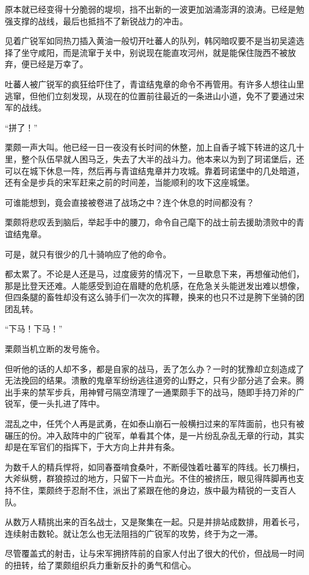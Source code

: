 原本就已经变得十分脆弱的堤坝，挡不出新的一波更加汹涌澎湃的浪涛。已经是勉强支撑的战线，最后也抵挡不了新锐战力的冲击。

见着广锐军如同热刀插入黄油一般切开吐蕃人的队列，韩冈暗叹要不是当初吴逵选择了坐守咸阳，而是流窜于关中，别说现在能直攻河州，就是能保住陇西不被放弃，便已经是万幸了。

吐蕃人被广锐军的疯狂给吓住了，青谊结鬼章的命令不再管用。有许多人想往山里逃窜，但他们立刻发现，从现在的位置前往最近的一条进山小道，免不了要通过宋军的战线。

“拼了！”

栗颇一声大叫。他已经一日一夜没有长时间的休整，加上自香子城下转进的这几十里，整个队伍早就人困马乏，失去了大半的战斗力。他本来以为到了珂诺堡后，还可以在城下休息一阵，然后再与青谊结鬼章并力攻城。靠着珂诺堡中的几处暗道，还有全是步兵的宋军赶来之前的时间差，当能顺利的攻下这座城堡。

可谁能想到，竟会直接被卷进了战场之中？连个休息的时间都没有？

栗颇将悲叹丢到脑后，举起手中的腰刀，命令自己麾下的战士前去援助溃败中的青谊结鬼章。

可是，就只有很少的几十骑响应了他的命令。

都太累了。不论是人还是马，过度疲劳的情况下，一旦歇息下来，再想催动他们，那是比登天还难。人能感受到迫在眉睫的危机感，在危急关头能迸发出难以想像，但四条腿的畜牲却没有这么骑手们一次次的挥鞭，换来的也只不过是胯下坐骑的团团乱转。

“下马！下马！”

栗颇当机立断的发号施令。

但听他的话的人却不多，都是自家的战马，丢了怎么办？一时的犹豫却立刻造成了无法挽回的结果。溃散的鬼章军纷纷逃往道旁的山野之，只有少部分逃了会来。腾出手来的禁军步兵，用神臂弓隔空清理了一通栗颇手下的战马，随即手持刀斧的广锐军，便一头扎进了阵中。

混乱之中，任凭个人再是武勇，在如泰山崩石一般横扫过来的军阵面前，也只有被碾压的份。冲入敌阵中的广锐军，单看其个体，是一片纷乱杂乱无章的行动，其实却是在军官们的指挥下，于大方向上井井有条。

为数千人的精兵悍将，如同春蚕啃食桑叶，不断侵蚀着吐蕃军的阵线。长刀横扫，大斧纵劈，群狼掠过的地方，只留下一片血光。不住的被挤压，眼见得阵脚再也支持不住，栗颇终于忍耐不住，派出了紧跟在他的身边，族中最为精锐的一支百人队。

从数万人精挑出来的百名战士，又是聚集在一起。只是并排站成数排，用着长弓，连续射击数轮。就让怎么也无法阻挡的广锐军的攻势，终于为之一滞。

尽管覆盖式的射击，让与宋军拥挤阵前的自家人付出了很大的代价，但战局一时间的扭转，给了栗颇组织兵力重新反扑的勇气和信心。

